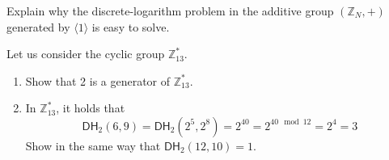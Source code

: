 \documentclass[a4paper,10pt,landscape,twocolumn]{scrartcl}
\begin{document}
\begin{exercise}
\begin{subex}
Explain why the discrete-logarithm problem in the additive group $(\mathbb{Z}_N, +)$ generated by $\langle 1\rangle$ is easy to solve.
\end{subex}

\begin{subex}
Let us consider the cyclic group $\mathbb{Z}_{13}^*$.
\begin{enumerate}
\item Show that 2 is a generator of $\mathbb{Z}_{13}^*$.
\item In $\mathbb{Z}_{13}^*$, it holds that 
\[
\mathsf{DH}_2(6,9) = \mathsf{DH}_2(2^5, 2^8) = 2^{40} = 2^{40 \mod 12} = 2^4 = 3
\]
Show in the same way that $\mathsf{DH}_2(12,10)=1$.
\end{enumerate}

\end{subex}

\end{exercise}


%


\end{document}
